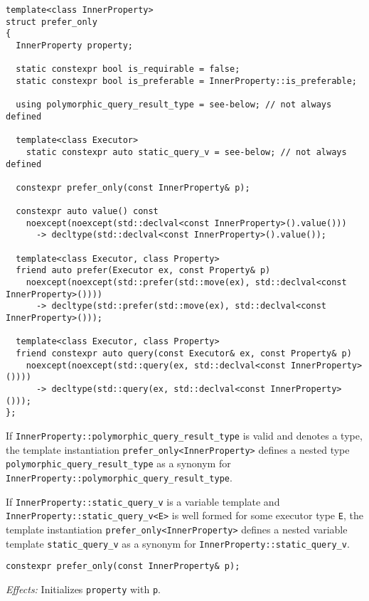 \documentclass[a4paper,12pt,notitlepage,twoside,openright]{article}
\begin{document}
\begin{verbatim}
template<class InnerProperty>
struct prefer_only
{
  InnerProperty property;

  static constexpr bool is_requirable = false;
  static constexpr bool is_preferable = InnerProperty::is_preferable;

  using polymorphic_query_result_type = see-below; // not always defined

  template<class Executor>
    static constexpr auto static_query_v = see-below; // not always defined

  constexpr prefer_only(const InnerProperty& p);

  constexpr auto value() const
    noexcept(noexcept(std::declval<const InnerProperty>().value()))
      -> decltype(std::declval<const InnerProperty>().value());

  template<class Executor, class Property>
  friend auto prefer(Executor ex, const Property& p)
    noexcept(noexcept(std::prefer(std::move(ex), std::declval<const InnerProperty>())))
      -> decltype(std::prefer(std::move(ex), std::declval<const InnerProperty>()));

  template<class Executor, class Property>
  friend constexpr auto query(const Executor& ex, const Property& p)
    noexcept(noexcept(std::query(ex, std::declval<const InnerProperty>())))
      -> decltype(std::query(ex, std::declval<const InnerProperty>()));
};
\end{verbatim}

If \texttt{InnerProperty::polymorphic_query_result_type} is
valid and denotes a type, the template instantiation
\texttt{prefer_only<InnerProperty>} defines a nested type
\texttt{polymorphic_query_result_type} as a synonym for
\texttt{InnerProperty::polymorphic_query_result_type}.

If \texttt{InnerProperty::static_query_v} is a variable
template and \texttt{InnerProperty::static_query_v<E>} is
well formed for some executor type \texttt{E}, the template
instantiation \texttt{prefer_only<InnerProperty>} defines a
nested variable template \texttt{static_query_v} as a
synonym for \texttt{InnerProperty::static_query_v}.

\begin{verbatim}
constexpr prefer_only(const InnerProperty& p);
\end{verbatim}

\emph{Effects:} Initializes \texttt{property} with
\texttt{p}.
\end{document}
